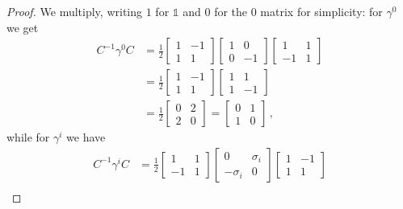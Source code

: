 \documentclass[main.tex]{subfiles}
\begin{document}
\begin{proof}
We multiply, writing \(1\) for \(\mathbb{1}\) and \(0\) for the 0 matrix for simplicity: for \(\gamma^{0}\) we get 
%
\begin{subequations}
\begin{align}
C^{-1} \gamma^{0} C &= \frac{1}{2} \left[\begin{array}{cc}
1 & -1 \\ 
1 & 1
\end{array}\right]
\left[\begin{array}{cc}
1 & 0 \\ 
0 & -1
\end{array}\right]
\left[\begin{array}{cc}
1 & 1 \\ 
-1 & 1
\end{array}\right]  \\
&= \frac{1}{2} \left[\begin{array}{cc}
1 & -1 \\ 
1 & 1
\end{array}\right] 
\left[\begin{array}{cc}
1 & 1 \\ 
1 & -1
\end{array}\right]  \\
&= \frac{1}{2} \left[\begin{array}{cc}
0 & 2 \\ 
2 & 0
\end{array}\right] = \left[\begin{array}{cc}
0 & 1 \\ 
1 & 0
\end{array}\right]
\,,
\end{align}
\end{subequations}
%
while for \(\gamma^{i}\) we have 
%
\begin{subequations}
\begin{align}
C^{-1} \gamma^{i} C &= \frac{1}{2} \left[\begin{array}{cc}
1 & 1 \\ 
-1 & 1
\end{array}\right]
\left[\begin{array}{cc}
0 & \sigma_{i} \\ 
- \sigma_{i} & 0
\end{array}\right] 
\left[\begin{array}{cc}
1 & -1 \\ 
1 & 1
\end{array}\right]  \\

\end{align}
\end{subequations}
\end{proof}
\end{document}
